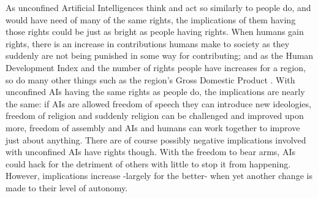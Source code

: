 As unconfined Artificial Intelligences think and act so similarly to people do, and would have need of many of the same rights, the implications of them having those rights could be just as bright as people having rights. When humans gain rights, there is an increase in contributions humans make to society as they suddenly are not being punished in some way for contributing; and as the Human Development Index and the number of rights people have increases for a region, so do many other things such as the region's Gross Domestic Product \cite{akbarkhodabakhshi2011}. With unconfined AIs having the same rights as people do, the implications are nearly the same: if AIs are allowed freedom of speech they can introduce new ideologies, freedom of religion and suddenly religion can be challenged and improved upon more, freedom of assembly and AIs and humans can work together to improve just about anything. There are of course possibly negative implications involved with unconfined AIs have rights though. With the freedom to bear arms, AIs could hack for the detriment of others with little to stop it from happening. However, implications increase -largely for the better- when yet another change is made to their level of autonomy.